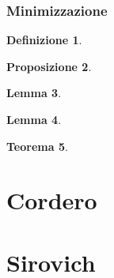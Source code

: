 \documentclass[10pt]{book}
\newcommand{\1}{\mathds{1}}
\theoremstyle{definition}%
\newtheorem{thm}{Teorema}[section]
\newtheorem{lem}[thm]{Lemma}
\newtheorem{prop}[thm]{Proposizione}
\theoremstyle{plain}
\newtheorem{definizione}[thm]{Definizione}
\theoremstyle{remark}
\begin{document}
\section{Minimizzazione}
\label{sec:orgcafe860}

\begin{definizione}

\end{definizione}
\begin{prop}
\lipsum[1]
\end{prop}
\begin{lem}
\lipsum[2]
\end{lem}

\begin{lem}
\lipsum[3]
\end{lem}

\begin{thm}
\lipsum[4]
\end{thm}
\part{Cordero}
\part{Sirovich}
\end{document}

